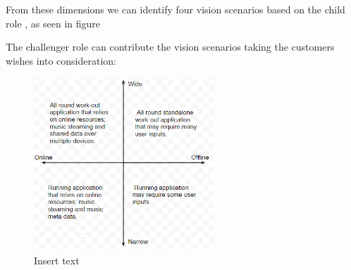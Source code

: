 
From these dimensions we can identify four vision scenarios based on the child role  \cite[ pp. 132-134]{essence}, as seen in figure 


The challenger role can contribute the vision scenarios taking the customers wishes into consideration:


\begin{figure}[h!]
  \centering
    \includegraphics[width=0.6\textwidth]{Images/axis1.PNG}
    \caption{Insert text}
    \label{fig:axis1}
\end{figure}

